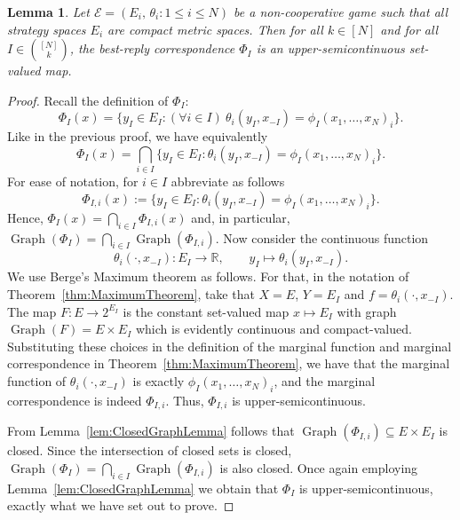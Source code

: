 \documentclass[a4paper,11pt,reqno,english]{amsart}
\theoremstyle{plain}
\newtheorem{lemma}[theorem]{Lemma}
\theoremstyle{definition}
\newcommand{\Ecal}{\mathcal{E}}
\begin{document}
\begin{lemma}\label{lem:MultilateralBestReplyUpperSemicontinuous}
	Let $\Ecal=(E_i,\,\theta_i : 1\leq i\leq N)$  be a non-cooperative game such that all strategy spaces $E_i$ are compact metric spaces.
	Then for all $k\in [N]$ and for all $I\in\binom{[N]}{k}$, the best-reply correspondence $\Phi_I$ is an upper-semicontinuous set-valued map.
\end{lemma}
\begin{proof}
	Recall the definition of $\Phi_I$:
	\begin{displaymath}
		\Phi_I(x) =\big\{y_I\in E_I : (\forall i\in I) \ \theta_i(y_I, x_{-I}) = \phi_I(x_1,\dots,x_N)_i\big\}.
	\end{displaymath}
	Like in the previous proof, we have equivalently
	\begin{displaymath}
		\Phi_I(x) = \bigcap_{i\in I}\big\{y_I\in E_I : \theta_i(y_I, x_{-I}) = \phi_I(x_1,\dots,x_N)_i\big\}.
	\end{displaymath}
	For ease of notation, for $i\in I$ abbreviate as follows
	\begin{displaymath}
		\Phi_{I,i}(x):= \big\{y_I\in E_I : \theta_i(y_I, x_{-I}) = \phi_I(x_1,\dots,x_N)_i\big\}.
	\end{displaymath}
	Hence, $\Phi_I(x) = \bigcap_{i\in I} \Phi_{I,i}(x)$ and, in particular, $\operatorname{Graph}(\Phi_I) = \bigcap_{i\in I}\operatorname{Graph}(\Phi_{I,i})$.
	Now consider the continuous function
	\begin{displaymath}
		\theta_i(\cdot, x_{-I}) \colon E_I \longrightarrow \mathbb{R}, \qquad y_I\longmapsto \theta_i(y_I, x_{-I}).
	\end{displaymath}
	We use Berge's Maximum theorem as follows.
	For that, in the notation of  Theorem~\ref{thm:MaximumTheorem}, take that $X = E$, $Y = E_I$ and $f = \theta_i(\cdot, x_{-I})$.
	The map $F \colon E\longrightarrow 2^{E_{I}}$ is the constant set-valued map $x \longmapsto E_{I}$ with graph $\operatorname{Graph}(F) = E \times E_I$ which is evidently continuous and compact-valued.
	Substituting these choices in the definition of the marginal function and marginal correspondence in Theorem~\ref{thm:MaximumTheorem}, we have that the marginal function of $\theta_i(\cdot, x_{-I})$ is exactly $\phi_I(x_1,\dots,x_N)_i$, and the marginal correspondence is indeed $\Phi_{I,i}$.
	Thus, $\Phi_{I,i}$ is upper-semicontinuous.

	\smallskip
	From Lemma~\ref{lem:ClosedGraphLemma} follows that $\operatorname{Graph}(\Phi_{I,i})\subseteq E \times E_I$ is closed.
	Since the intersection of closed sets is closed, $\operatorname{Graph}(\Phi_I) = \bigcap_{i\in I}\operatorname{Graph}(\Phi_{I,i})$ is also closed.
	Once again employing Lemma~\ref{lem:ClosedGraphLemma} we obtain that $\Phi_I$ is upper-semicontinuous, exactly what we have set out to prove.
\end{proof}
\end{document}
